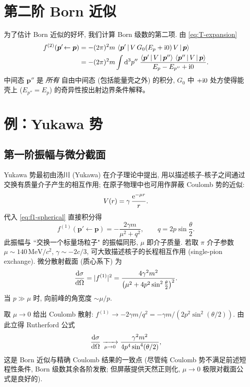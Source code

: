\section{第二阶 Born 近似}\label{sec:second-born}

为了估计 Born 近似的好坏, 我们计算 Born 级数的第二项. 由 \eqref{eq:T-expansion}
\begin{align}
f^{(2)}(\bm p'\!\leftarrow\bm p)
&=-(2\pi)^{2}m\,\left\langle \bm p' \,\middle|\, V\,G_0(E_p+\mathrm{i} 0)\,V \,\middle|\, \bm p \right\rangle\notag\\
&=-(2\pi)^{2}m\int\mathrm{d}^{3}p''\;\frac{\left\langle \bm p' \,\middle|\, V \,\middle|\, \bm p'' \right\rangle\,\left\langle \bm p'' \,\middle|\, V \,\middle|\, \bm p \right\rangle}{E_{p}-E_{p''}+\mathrm{i} 0}.
\label{eq:f2-general}
\end{align}
中间态 $\bm p''$ 是 \emph{所有} 自由中间态 (包括能量壳之外) 的积分, $G_0$ 中 $+\mathrm{i} 0$ 处方使得能壳上 ($E_{p''}=E_p$) 的奇异性按出射边界条件解释。

\section{例：Yukawa 势}\label{sec:yukawa}

\subsection{第一阶振幅与微分截面}

Yukawa 势最初由汤川 (Yukawa) 在介子理论中提出, 用以描述核子-核子之间通过交换有质量介子产生的相互作用; 在原子物理中也可用作屏蔽 Coulomb 势的近似:
\begin{equation}
V(r)=\gamma\,\frac{\mathrm{e}^{-\mu r}}{r}.
\end{equation}
代入 \eqref{eq:f1-spherical} 直接积分得
\begin{equation}
f^{(1)}(\bm p'\!\leftarrow\bm p)=-\frac{2\gamma m}{\mu^{2}+q^{2}},\qquad q=2p\sin\frac{\theta}{2}.
\label{eq:f1-yukawa}
\end{equation}
此振幅与 “交换一个标量场粒子" 的振幅同形, $\mu$ 即介子质量. 若取 $\pi$ 介子参数 $\mu\sim 140\,\mathrm{MeV}/c^{2}$, $\gamma\sim -2c/3$, 可大致描述核子的长程相互作用 (single-pion exchange). 微分散射截面 (质心系下) 为
\begin{equation}
\frac{\mathrm{d}\sigma}{\mathrm{d}\Omega}=|f^{(1)}|^{2}
=\frac{4\gamma^{2}m^{2}}{\bigl(\mu^{2}+4p^{2}\sin^{2}\frac{\theta}{2}\bigr)^{2}}.
\label{eq:dsigma-yukawa}
\end{equation}
当 $p\gg\mu$ 时, 向前峰的角宽度 $\sim\mu/p$.

\begin{remark}[屏蔽 Coulomb 极限]
取 $\mu\to 0$ 给出 Coulomb 散射: $f^{(1)}\to-2\gamma m/q^{2}=-\gamma m/(2p^{2}\sin^{2}(\theta/2))$. 由此立得 Rutherford 公式
\begin{equation}
\frac{\mathrm{d}\sigma}{\mathrm{d}\Omega}\xrightarrow[\mu\to 0]{}
\frac{\gamma^{2}m^{2}}{4p^{4}\sin^{4}(\theta/2)} ,
\end{equation}
这是 Born 近似与精确 Coulomb 结果的一致点 (尽管纯 Coulomb 势不满足前述短程性条件, Born 级数其余各阶发散; 但屏蔽提供天然正则化, $\mu\to 0$ 极限对截面公式是良好的).
\end{remark}

